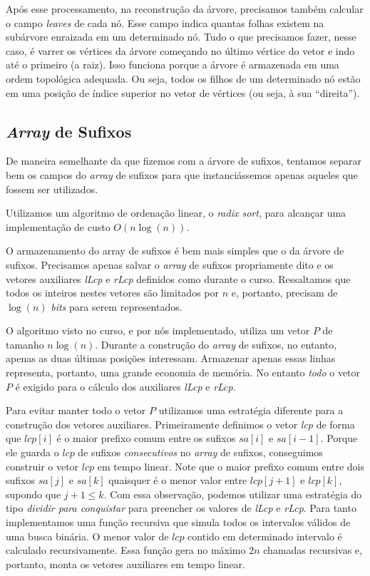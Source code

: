 \documentclass[]{article}
\begin{document}
Após esse processamento, na reconstrução da árvore, precisamos também calcular o campo \textit{leaves} de cada nó. Esse campo indica quantas folhas existem na subárvore enraizada em um determinado nó. Tudo o que precisamos fazer, nesse caso, é varrer os vértices da árvore começando no último vértice do vetor e indo até o primeiro (a raiz). Isso funciona porque a árvore é armazenada em uma ordem topológica adequada. Ou seja, todos os filhos de um determinado nó estão em uma posição de índice superior no vetor de vértices (ou seja, à sua ``direita'').

\subsection{\textit{Array} de Sufixos}

De maneira semelhante da que fizemos com a árvore de sufixos, tentamos separar bem os campos do \textit{array} de sufixos para que instanciássemos apenas aqueles que fossem ser utilizados.

Utilizamos um algoritmo de ordenação linear, o \textit{radix sort}, para alcançar uma implementação de custo $O(n\log(n))$.

O armazenamento do array de sufixos é bem mais simples que o da árvore de sufixos. Precisamos apenas salvar o \textit{array} de sufixos propriamente dito e os vetores auxiliares \textit{lLcp} e \textit{rLcp} definidos como durante o curso. Ressaltamos que todos os inteiros nestes vetores são limitados por $n$ e, portanto, precisam de $\log(n)$ \textit{bits} para serem representados.

O algoritmo visto no curso, e por nós implementado, utiliza um vetor $P$ de tamanho $n\log(n)$. Durante a construção do \textit{array} de sufixos, no entanto, apenas as duas últimas posições interessam. Armazenar apenas essas linhas representa, portanto, uma grande economia de memória. No entanto \textit{todo} o vetor $P$ é exigido para o cálculo dos auxiliares \textit{lLcp} e \textit{rLcp}.

Para evitar manter todo o vetor $P$ utilizamos uma estratégia diferente para a construção dos vetores auxiliares. Primeiramente definimos o vetor \textit{lcp} de forma que $lcp[i]$ é o maior prefixo comum entre os sufixos $sa[i]$ e $sa[i-1]$. Porque ele guarda o $lcp$ de sufixos \textit{consecutivos} no \textit{array} de sufixos, conseguimos construir o vetor $lcp$ em tempo linear. Note que o maior prefixo comum entre dois sufixos $sa[j]$ e $sa[k]$ quaisquer é o menor valor entre $lcp[j+1]$ e $lcp[k]$, supondo que $j+1 \leq k$. Com essa observação, podemos utilizar uma estratégia do tipo \textit{dividir para conquistar} para preencher os valores de \textit{lLcp} e \textit{rLcp}. Para tanto implementamos uma função recursiva que simula todos os intervalos válidos de uma busca binária. O menor valor de $lcp$ contido em determinado intervalo é calculado recursivamente. Essa função gera no máximo $2n$ chamadas recursivas e, portanto, monta os vetores auxiliares em tempo linear.
\end{document}
